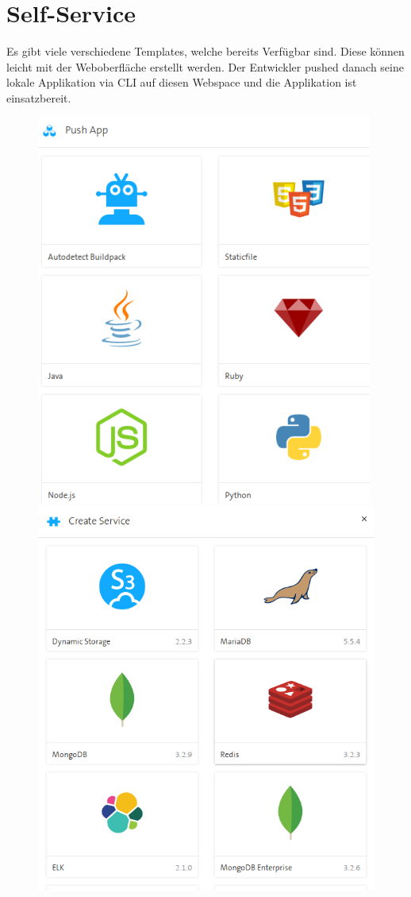 \section{Self-Service}
Es gibt viele verschiedene Templates, welche bereits Verfügbar sind. Diese können leicht mit der Weboberfläche erstellt werden. Der Entwickler pushed danach seine lokale Applikation via CLI auf diesen Webspace und die Applikation ist einsatzbereit.
\begin{figure}[H]
\centering
\includegraphics[scale=0.65]{images/image01.png} 
\includegraphics[scale=0.3]{images/image08.png} 
\end{figure}


